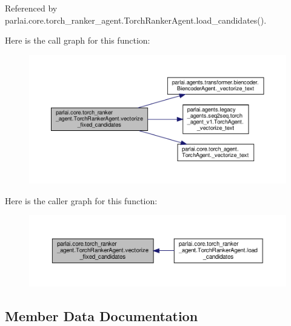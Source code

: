 Referenced by parlai.\+core.\+torch\+\_\+ranker\+\_\+agent.\+Torch\+Ranker\+Agent.\+load\+\_\+candidates().

Here is the call graph for this function\+:
\nopagebreak
\begin{figure}[H]
\begin{center}
\leavevmode
\includegraphics[width=350pt]{classparlai_1_1core_1_1torch__ranker__agent_1_1TorchRankerAgent_af2e2d618f056bb68089c7252fa07d07b_cgraph}
\end{center}
\end{figure}
Here is the caller graph for this function\+:
\nopagebreak
\begin{figure}[H]
\begin{center}
\leavevmode
\includegraphics[width=350pt]{classparlai_1_1core_1_1torch__ranker__agent_1_1TorchRankerAgent_af2e2d618f056bb68089c7252fa07d07b_icgraph}
\end{center}
\end{figure}


\subsection{Member Data Documentation}
\mbox{\label{classparlai_1_1core_1_1torch__ranker__agent_1_1TorchRankerAgent_af54615af2f53a06df8fb046492f1ec38}} 
